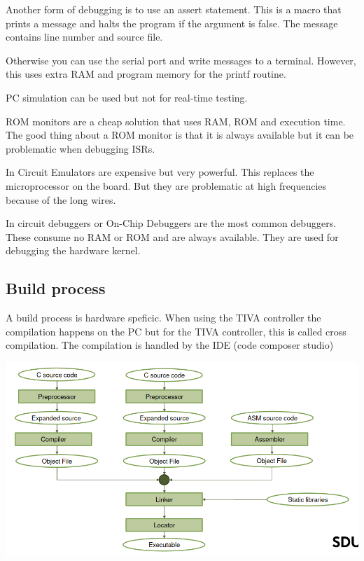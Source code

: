Another form of debugging is to use an assert statement. This
is a macro that prints a message and halts the program if the
argument is false. The message contains line number and source file.

Otherwise you can use the serial port and write messages to a terminal.
However, this uses extra RAM and program memory for the printf routine.

PC simulation can be used but not for real-time testing.

ROM monitors are a cheap solution that uses RAM, ROM and execution time.
The good thing about a ROM monitor is that it is always available
but it can be problematic when debugging ISRs.

In Circuit Emulators are expensive but very powerful. This replaces the
microprocessor on the board. But they are problematic at high frequencies
because of the long wires.

In circuit debuggers or On-Chip Debuggers are the most common debuggers.
These consume no RAM or ROM and are always available. They are used
for debugging the hardware kernel.



\subsection{Build process}

A build process is hardware speficic. When using the TIVA controller
the compilation happens on the PC but for the TIVA controller, this
is called cross compilation. The compilation is handled by the IDE
(code composer studio)

\begin{center}
	\includegraphics[width=\textwidth]{images/build.png}
\end{center}


